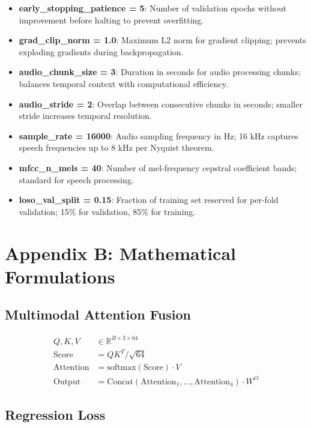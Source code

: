 \documentclass[12pt]{article}
\begin{document}
\begin{itemize}
		\item \textbf{early\_stopping\_patience = 5}: Number of validation epochs without improvement before halting to prevent overfitting.

		\item \textbf{grad\_clip\_norm = 1.0}: Maximum L2 norm for gradient clipping; prevents exploding gradients during backpropagation.

		\item \textbf{audio\_chunk\_size = 3}: Duration in seconds for audio processing chunks; balances temporal context with computational efficiency.

		\item \textbf{audio\_stride = 2}: Overlap between consecutive chunks in seconds; smaller stride increases temporal resolution.

		\item \textbf{sample\_rate = 16000}: Audio sampling frequency in Hz; 16 kHz captures speech frequencies up to 8 kHz per Nyquist theorem.

		\item \textbf{mfcc\_n\_mels = 40}: Number of mel-frequency cepstral coefficient bands; standard for speech processing.

		\item \textbf{loso\_val\_split = 0.15}: Fraction of training set reserved for per-fold validation; 15\% for validation, 85\% for training.
	\end{itemize}

	\section*{Appendix B: Mathematical Formulations}

	\subsection*{Multimodal Attention Fusion}

	\begin{align}
	Q, K, V &\in \mathbb{R}^{B \times 3 \times 64} \\
	\text{Score} &= QK^T / \sqrt{64} \\
	\text{Attention} &= \text{softmax}(\text{Score}) \cdot V \\
	\text{Output} &= \text{Concat}(\text{Attention}_1, \ldots, \text{Attention}_4) \cdot W^O
	\end{align}

	\subsection*{Regression Loss}
\end{document}
